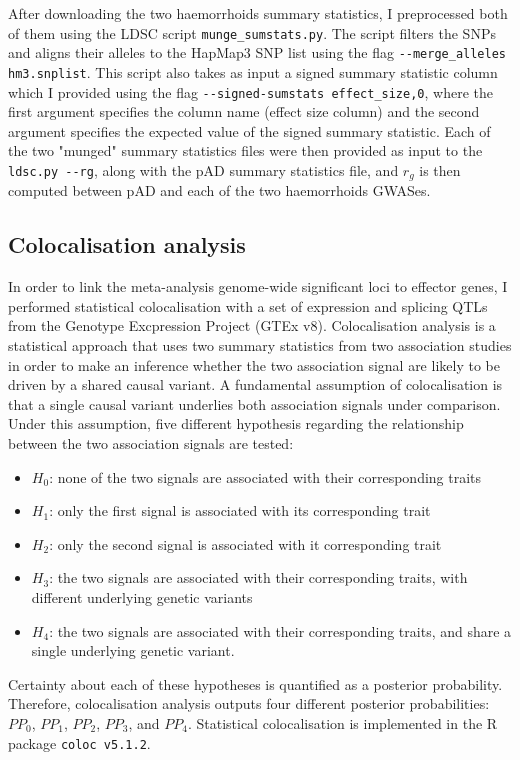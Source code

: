After downloading the two haemorrhoids summary statistics, I preprocessed both of them using the LDSC script \Verb+munge_sumstats.py+. The script filters the SNPs and aligns their alleles to the HapMap3 SNP list using the flag \Verb+--merge_alleles hm3.snplist+. This script also takes as input a signed summary statistic column which I provided using the flag \Verb+--signed-sumstats effect_size,0+, where the first argument specifies the column name (effect size column) and the second argument specifies the expected value of the signed summary statistic. Each of the two "munged" summary statistics files were then provided as input to the \Verb+ldsc.py --rg+, along with the pAD summary statistics file, and $r_{g}$ is then computed between pAD and each of the two haemorrhoids GWASes. 


\subsection{Colocalisation analysis}
In order to link the meta-analysis genome-wide significant loci to effector genes, I performed statistical colocalisation with a set of expression and splicing QTLs from the Genotype Excpression Project (GTEx v8). Colocalisation analysis is a statistical approach that uses two summary statistics from two association studies in order to make an inference whether the two association signal are likely to be driven by a shared causal variant. A fundamental assumption of colocalisation is that a single causal variant underlies both association signals under comparison. Under this assumption, five different hypothesis regarding the relationship between the two association signals are tested:
\begin{itemize}
  \item $H_{0}$: none of the two signals are associated with their corresponding traits
  \item $H_{1}$: only the first signal is associated with its corresponding trait
  \item $H_{2}$: only the second signal is associated with it corresponding trait
  \item $H_{3}$: the two signals are associated with their corresponding traits, with different underlying genetic variants
  \item $H_{4}$: the two signals are associated with their corresponding traits, and share a single underlying genetic variant.
\end{itemize}
Certainty about each of these hypotheses is quantified as a posterior probability. Therefore, colocalisation analysis outputs four different posterior probabilities: $PP_{0}$, $PP_{1}$, $PP_{2}$, $PP_{3}$, and $PP_{4}$. Statistical colocalisation is implemented in the R package \Verb+coloc v5.1.2+.

